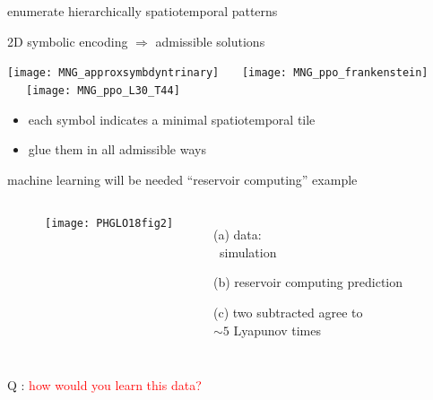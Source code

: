 \begin{frame}{enumerate hierarchically spatiotemporal patterns }
  \begin{block} {2D symbolic encoding $\Rightarrow$ admissible solutions}
  \begin{center}
\texttt{[image: MNG\_approxsymbdyntrinary]}
~~~\texttt{[image: MNG\_ppo\_frankenstein]}
~~~\texttt{[image: MNG\_ppo\_L30\_T44]}
  \end{center}
  \end{block}
\begin{itemize}
 \item each symbol indicates a minimal spatiotemporal tile
 \item glue them in all admissible ways
\end{itemize}
\end{frame}

\begin{frame}{machine learning will be needed}
``reservoir computing'' example
\bigskip

 \begin{columns}
~~~~~~\texttt{[image: PHGLO18fig2]}
 \begin{itemize}
 \item[(a)] data: \\ \KS\ simulation
 \item[(b)] reservoir computing prediction
 \item[(c)] two subtracted agree to \\
            $\sim 5$ Lyapunov times
 \end{itemize}
 \end{columns}
\vfill {\Large Q : \textcolor{red}{how would you learn this data?}}
\end{frame}

